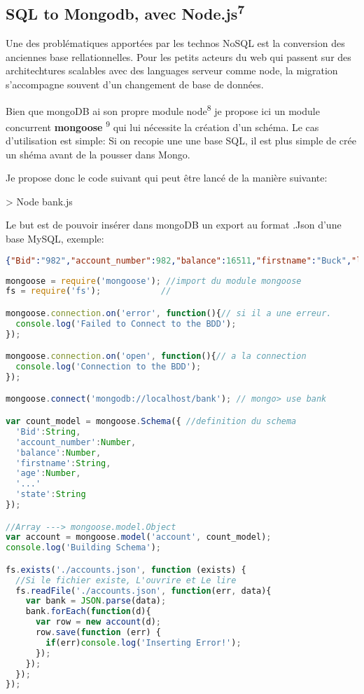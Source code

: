 \subsection*{SQL to Mongodb, avec Node.js\textsuperscript{7}}

\par Une des problématiques apportées par les technos NoSQL est la conversion des anciennes base rellationnelles. Pour les petits acteurs du web qui passent sur des architechtures scalables avec des languages serveur comme node, la migration s'accompagne souvent d'un changement de base de données.

\par Bien que mongoDB ai son propre module node\textsuperscript{8} je propose ici un module concurrent \textbf{mongoose} \textsuperscript{9} qui lui nécessite la création d'un schéma. Le cas d'utilisation est simple: Si on recopie une une base SQL, il est plus simple de crée un shéma avant de la pousser dans Mongo.

\par Je propose donc le code suivant qui peut être lancé de la manière suivante:\newline
\begin{tt} > Node bank.js \end{tt} Le but est de pouvoir insérer dans mongoDB un export au format .Json d'une base MySQL, exemple:

\begin{lstlisting}[language=JSON, caption=Une ligne de l'export.]
{"Bid":"982","account_number":982,"balance":16511,"firstname":"Buck","lastname":"Robinson","age":24,...,"email":"buckrobinson@calcu.com"}
\end{lstlisting}

\begin{lstlisting}[language=JavaScript, caption=SQL to MongoDb avec le module Mongoose.]
mongoose = require('mongoose'); //import du module mongoose
fs = require('fs');            //

mongoose.connection.on('error', function(){// si il a une erreur.
  console.log('Failed to Connect to the BDD');
});

mongoose.connection.on('open', function(){// a la connection
  console.log('Connection to the BDD');
});

mongoose.connect('mongodb://localhost/bank'); // mongo> use bank

var count_model = mongoose.Schema({ //definition du schema
  'Bid':String,
  'account_number':Number,
  'balance':Number,
  'firstname':String,
  'age':Number,
  '...'
  'state':String
});

//Array ---> mongoose.model.Object
var account = mongoose.model('account', count_model);
console.log('Building Schema');

fs.exists('./accounts.json', function (exists) {
  //Si le fichier existe, L'ouvrire et Le lire
  fs.readFile('./accounts.json', function(err, data){
    var bank = JSON.parse(data);
    bank.forEach(function(d){
      var row = new account(d);
      row.save(function (err) {
        if(err)console.log('Inserting Error!');
      });
    });
  });
});
\end{lstlisting}

